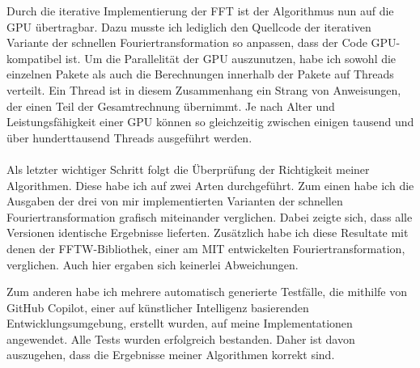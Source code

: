 \documentclass[a4paper,12pt]{article}
\theoremstyle{definition}
\theoremstyle{remark}
\begin{document}
Durch die iterative Implementierung der FFT ist der Algorithmus nun auf die GPU übertragbar. Dazu musste ich lediglich den Quellcode 
der iterativen Variante der schnellen Fouriertransformation so anpassen, dass der Code GPU-kompatibel ist. Um die Parallelität der GPU 
auszunutzen, habe ich sowohl die einzelnen Pakete als auch die Berechnungen innerhalb der Pakete auf Threads verteilt. Ein Thread ist 
in diesem Zusammenhang ein Strang von Anweisungen, der einen Teil der Gesamtrechnung übernimmt. Je nach Alter und Leistungsfähigkeit 
einer GPU können so gleichzeitig zwischen einigen tausend und über hunderttausend Threads ausgeführt werden.
\\\\
Als letzter wichtiger Schritt folgt die Überprüfung der Richtigkeit meiner Algorithmen. Diese habe ich auf zwei Arten durchgeführt.
Zum einen habe ich die Ausgaben der drei von mir implementierten Varianten der schnellen Fouriertransformation grafisch miteinander 
verglichen. Dabei zeigte sich, dass alle Versionen identische Ergebnisse lieferten. Zusätzlich habe ich diese Resultate mit denen der 
FFTW-Bibliothek, einer am MIT entwickelten Fouriertransformation, verglichen. Auch hier ergaben sich keinerlei 
Abweichungen.

Zum anderen habe ich mehrere automatisch generierte Testfälle, die mithilfe von GitHub Copilot, einer auf künstlicher Intelligenz 
basierenden Entwicklungsumgebung, erstellt wurden, auf meine Implementationen angewendet. Alle Tests wurden erfolgreich bestanden. 
Daher ist davon auszugehen, dass die Ergebnisse meiner Algorithmen korrekt sind.
\end{document}
